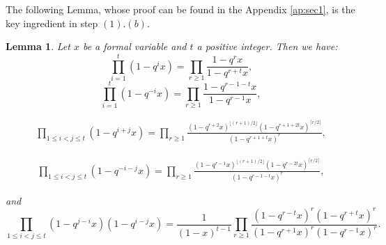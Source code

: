 \documentclass[11pt,letterpaper]{amsart}
\newtheorem{lm}[df]{Lemma}
\numberwithin{equation}{section}
\numberwithin{df}{section}
\begin{document}
The following Lemma, whose proof can be found in the Appendix \ref{ap:sec1}, is the key ingredient in step $(1).(b)$.
\begin{lm}\label{lem:lemtech}
Let $x$ be a formal variable and $t$ a positive integer. Then we have:
\begin{equation}\label{techsimple}
\prod_{i=1}^t\left(1-q^ix\right)=\prod_{r\geq 1}\frac{1-q^{r}x}{1-q^{r+t}x},
\end{equation}
\begin{equation}\label{techsimpleneg}
\prod_{i=1}^t\left(1-q^{-i}x\right)=\prod_{r\geq 1}\frac{1-q^{r-1-t}x}{1-q^{r-1}x},
\end{equation}



\begin{align}\label{techstrictplus}
\prod_{1\leq i<j\leq t}\left(1-q^{i+j}x\right)=\prod_{r\geq 1}\frac{\left(1-q^{r+2}x\right)^{\lfloor (r+1)/2\rfloor}\left(1-q^{r+1+2t}x\right)^{\lceil r/2 \rceil}}{\left(1-q^{r+1+t}x\right)^r},
\end{align}

\begin{align}\label{techstrictmoins}
\prod_{1\leq i<j\leq t}\left(1-q^{-i-j}x\right)=\prod_{r\geq 1}\frac{\left(1-q^{r-1}x\right)^{\lfloor (r+1)/2\rfloor}\left(1-q^{r-2t}x\right)^{\lceil r/2 \rceil}}{\left(1-q^{r-1-t}x\right)^r},
\end{align}

and
\begin{equation}\label{techtypea}
\prod_{1\leq i<j\leq t}\left(1-q^{j-i}x\right)\left(1-q^{i-j}x\right)=\frac{1}{\left(1-x\right)^{t-1}}\prod_{r\geq 1}\frac{\left(1-q^{r-t}x\right)^r\left(1-q^{r+t}x\right)^r}{\left(1-q^{r+1}x\right)^r\left(1-q^{r-1}x\right)^r}.
\end{equation}



\end{lm}



\end{document}
